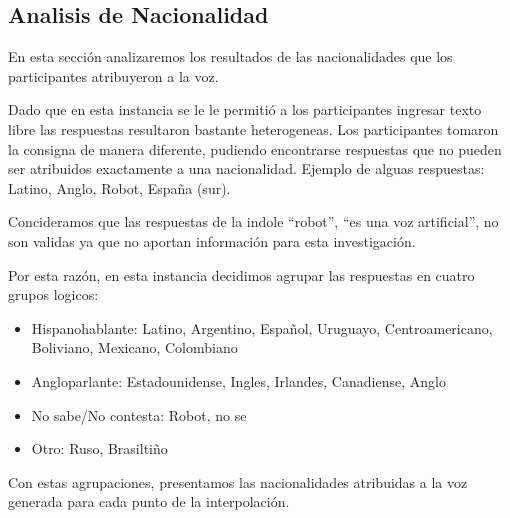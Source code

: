 \recordar


\clearpage
\subsection{Analisis de Nacionalidad}


En esta sección analizaremos los resultados de las nacionalidades que los participantes atribuyeron a la voz.

Dado que en esta instancia se le le permitió a los participantes ingresar texto libre las respuestas resultaron bastante heterogeneas. Los participantes tomaron la consigna de manera diferente, pudiendo encontrarse respuestas que no pueden ser atribuidos exactamente a una nacionalidad. Ejemplo de alguas respuestas: Latino, Anglo, Robot, España (sur).

Concideramos que las respuestas de la indole ``robot'', ``es una voz artificial'', no son validas ya que no aportan información para esta investigación.

Por esta razón, en esta instancia decidimos agrupar las respuestas en cuatro grupos logicos:

\begin{itemize}
	\item Hispanohablante: Latino, Argentino, Español, Uruguayo, Centroamericano, Boliviano, Mexicano, Colombiano
	\item Angloparlante: Estadounidense, Ingles, Irlandes, Canadiense, Anglo
	\item No sabe/No contesta: Robot, no se
	\item Otro: Ruso, Brasiltiño
\end{itemize}

Con estas agrupaciones, presentamos las nacionalidades atribuidas a la voz generada para cada punto de la interpolación.

